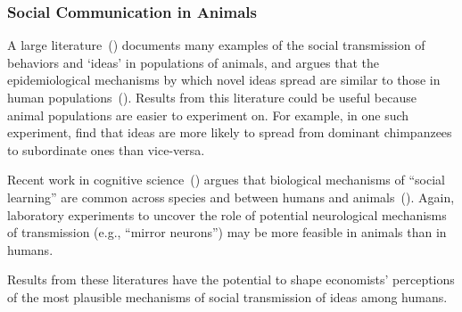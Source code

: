 

\hypertarget{animals}{}
\subsubsection{Social Communication in Animals} \label{subsubsec:animals}

A large literature~(\cite{whiten2021burgeoning}) documents many examples of the social transmission of behaviors and `ideas' in populations of animals, and argues that the epidemiological mechanisms by which novel ideas spread are similar to those in human populations~(\cite{whiten2016cultural}).  Results from this literature could be useful because animal populations are easier to experiment on.  For example, in one such experiment, \cite{kendal2015chimpanzees} find that ideas are more likely to spread from dominant chimpanzees to subordinate ones than vice-versa.

Recent work in cognitive science~(\cite{kendal2018social}) argues that biological mechanisms of ``social learning'' are common across species and between humans and animals~(\cite{carcea2019biological}).   Again, laboratory experiments to uncover the role of potential neurological mechanisms of transmission (e.g., ``mirror neurons'') may be more feasible in animals than in humans.

Results from these literatures have the potential to shape economists' perceptions of the most plausible mechanisms of social transmission of ideas among humans.
